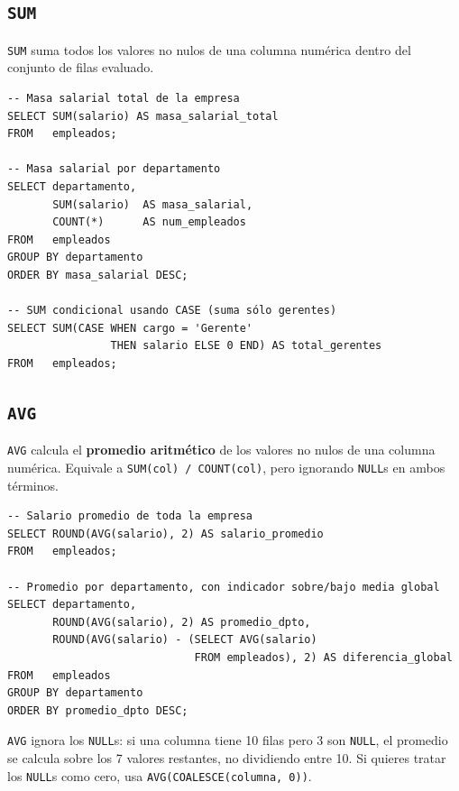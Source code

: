 \subsection{\texttt{SUM}}

\texttt{SUM} suma todos los valores no nulos de una columna
numérica dentro del conjunto de filas evaluado.

\begin{lstlisting}[caption={SUM: suma total y por grupo.}]
-- Masa salarial total de la empresa
SELECT SUM(salario) AS masa_salarial_total
FROM   empleados;

-- Masa salarial por departamento
SELECT departamento,
       SUM(salario)  AS masa_salarial,
       COUNT(*)      AS num_empleados
FROM   empleados
GROUP BY departamento
ORDER BY masa_salarial DESC;

-- SUM condicional usando CASE (suma sólo gerentes)
SELECT SUM(CASE WHEN cargo = 'Gerente'
                THEN salario ELSE 0 END) AS total_gerentes
FROM   empleados;
\end{lstlisting}

\subsection{\texttt{AVG}}

\texttt{AVG} calcula el \textbf{promedio aritmético} de los valores
no nulos de una columna numérica.
Equivale a \texttt{SUM(col) / COUNT(col)}, pero ignorando
\texttt{NULL}s en ambos términos.

\begin{lstlisting}[caption={AVG: promedio general y por grupo.}]
-- Salario promedio de toda la empresa
SELECT ROUND(AVG(salario), 2) AS salario_promedio
FROM   empleados;

-- Promedio por departamento, con indicador sobre/bajo media global
SELECT departamento,
       ROUND(AVG(salario), 2) AS promedio_dpto,
       ROUND(AVG(salario) - (SELECT AVG(salario)
                             FROM empleados), 2) AS diferencia_global
FROM   empleados
GROUP BY departamento
ORDER BY promedio_dpto DESC;
\end{lstlisting}

\begin{nota}
\texttt{AVG} ignora los \texttt{NULL}s: si una columna tiene 10
filas pero 3 son \texttt{NULL}, el promedio se calcula sobre los
7 valores restantes, no dividiendo entre 10.
Si quieres tratar los \texttt{NULL}s como cero, usa
\texttt{AVG(COALESCE(columna, 0))}.
\end{nota}

